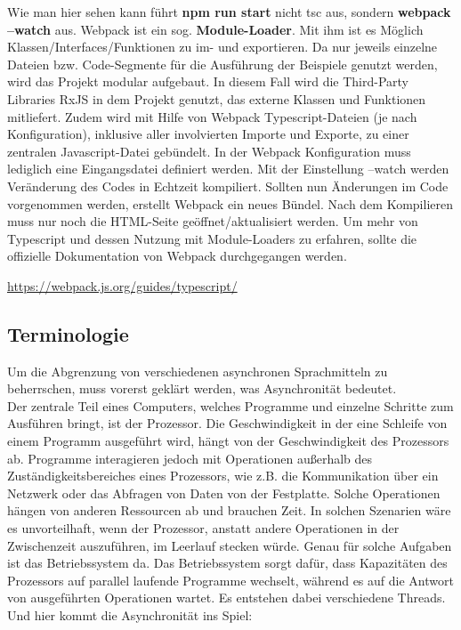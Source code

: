 \noindent
Wie man hier sehen kann führt \textbf{npm run start} nicht tsc aus, sondern \textbf{webpack --watch} aus. Webpack ist ein sog. \textbf{Module-Loader}. Mit ihm ist es Möglich Klassen/Interfaces/Funktionen zu im- und exportieren. Da nur jeweils einzelne Dateien bzw. Code-Segmente für die Ausführung der Beispiele genutzt werden, wird das Projekt modular aufgebaut. In diesem Fall wird die Third-Party Libraries RxJS in dem Projekt genutzt, das externe Klassen und Funktionen mitliefert. Zudem wird mit Hilfe von Webpack Typescript-Dateien (je nach Konfiguration), inklusive aller involvierten Importe und Exporte, zu einer zentralen Javascript-Datei gebündelt. In der Webpack Konfiguration muss lediglich eine Eingangsdatei definiert werden. Mit der Einstellung --watch werden Veränderung des Codes in Echtzeit kompiliert. Sollten nun Änderungen im Code vorgenommen werden, erstellt Webpack ein neues Bündel. Nach dem Kompilieren muss nur noch die HTML-Seite geöffnet/aktualisiert werden. Um mehr von Typescript und dessen Nutzung mit Module-Loaders zu erfahren, sollte die offizielle Dokumentation von Webpack durchgegangen werden.

\begin{center}
\url{https://webpack.js.org/guides/typescript/} 
\end{center}

\subsection{Terminologie}

Um die Abgrenzung von verschiedenen asynchronen Sprachmitteln zu beherrschen, muss vorerst geklärt werden, was Asynchronität bedeutet.\\

\noindent
Der zentrale Teil eines Computers, welches Programme und einzelne Schritte zum Ausführen bringt, ist der Prozessor. Die Geschwindigkeit in der eine Schleife von einem Programm ausgeführt wird, hängt von der Geschwindigkeit des Prozessors ab. Programme interagieren jedoch mit Operationen außerhalb des Zuständigkeitsbereiches eines Prozessors, wie z.B. die Kommunikation über ein Netzwerk oder das Abfragen von Daten von der Festplatte. Solche Operationen hängen von anderen Ressourcen ab und brauchen Zeit. In solchen Szenarien wäre es unvorteilhaft, wenn der Prozessor, anstatt andere Operationen in der Zwischenzeit auszuführen, im Leerlauf stecken würde. Genau für solche Aufgaben ist das Betriebssystem da. Das Betriebssystem sorgt dafür, dass Kapazitäten des Prozessors auf parallel laufende Programme wechselt, während es auf die Antwort von ausgeführten Operationen wartet. Es entstehen dabei verschiedene \glqq Threads\grqq{}. Und hier kommt die Asynchronität ins Spiel:

